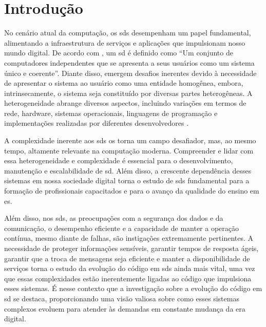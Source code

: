 
\chapter{Introdução}\label{cap:introducao}
No cenário atual da computação, os \gls{sds} desempenham um papel fundamental, alimentando a infraestrutura de serviços e aplicações que impulsionam nosso mundo digital. De acordo com , um \gls{sd} é definido como ``Um conjunto de computadores independentes que se apresenta a seus usuários como um sistema único e coerente''. Diante disso, emergem desafios inerentes devido à necessidade de apresentar o sistema ao usuário como uma entidade homogênea, embora, intrinsecamente, o sistema seja constituído por diversas partes heterogêneas. A heterogeneidade abrange diversos aspectos, incluindo variações em termos de rede, hardware, sistemas operacionais, linguagens de programação e implementações realizadas por diferentes desenvolvedores \cite{DistributedSystemsCoulouris}.

A complexidade inerente aos \gls{sds} os torna um campo desafiador, mas, ao mesmo tempo, altamente relevante na computação moderna. Compreender e lidar com essa heterogeneidade e complexidade é essencial para o desenvolvimento, manutenção e escalabilidade de \gls{sd}. Além disso, a crescente dependência desses sistemas em nossa sociedade digital torna o estudo de \gls{sds} fundamental para a formação de profissionais capacitados e para o avanço da qualidade do ensino em \gls{es}.

Além disso, nos \gls{sds}, as preocupações com a segurança dos dados e da comunicação, o desempenho eficiente e a capacidade de manter a operação contínua, mesmo diante de falhas, são instigações extremamente pertinentes. A necessidade de proteger informações sensíveis, garantir tempos de resposta ágeis, garantir que a troca de mensagens seja eficiente e manter a disponibilidade de serviços torna o estudo da evolução do código em \gls{sds} ainda mais vital, uma vez que essas complexidades estão inerentemente ligadas ao código que impulsiona esses sistemas. É nesse contexto que a investigação sobre a evolução do código em \gls{sd} se destaca, proporcionando uma visão valiosa sobre como esses sistemas complexos evoluem para atender às demandas em constante mudança da era digital.

